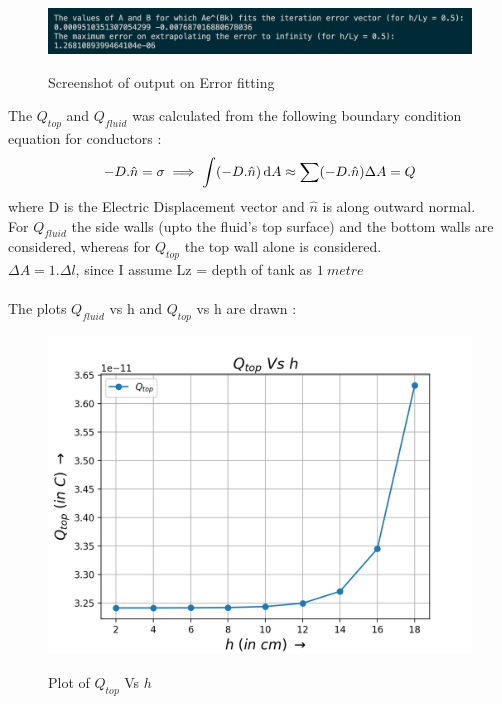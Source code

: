 \documentclass[11pt, a4paper]{article}
\begin{document}
\begin{figure}[H]
   	\centering
   	\includegraphics[scale=0.5]{error_fit.png}
   	\label{fig:error_fit}
   	\caption{Screenshot of output on Error fitting}
\end{figure}
The $Q_{top}$ and $Q_{fluid}$ was calculated from the following boundary condition equation for conductors :
\[
  -D.\hat{n} = \sigma
  \\ \implies 
  \int (-D.\hat{n}) \,\mathrm{d}A
  \\ \approx
  \sum (-D.\hat{n})\Delta A = Q 
\]
where D is the Electric Displacement vector and $\hat{n}$ is along outward normal.
\\
For $Q_{fluid}$ the side walls (upto the fluid's top surface) and the bottom walls are considered, whereas for $Q_{top}$ the top wall alone is considered.
\\
\indent$\Delta A = 1.\Delta l$, since I assume Lz = depth of tank as $1\ metre$
\\ \\
The plots $Q_{fluid}$ vs h and $Q_{top}$ vs h are drawn :
\begin{figure}[H]
  \centering
  \includegraphics[scale=0.6]{qtop.png}
  \label{fig:qtop}
  \caption{Plot of $Q_{top}$ Vs $h$}
\end{figure}
\end{document}
